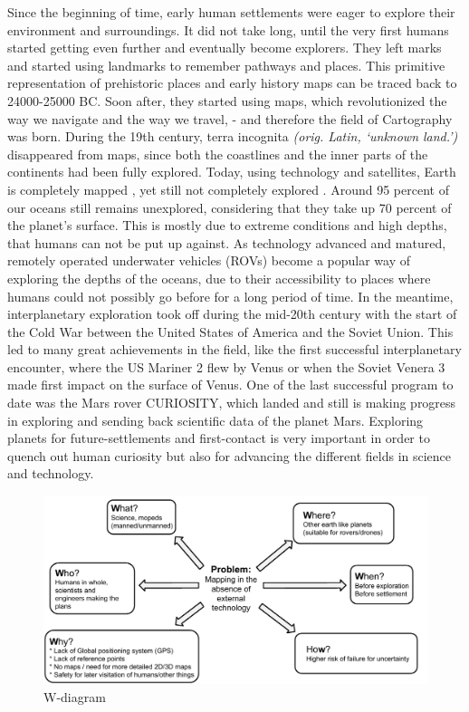 Since the beginning of time, early human settlements were eager to explore their environment and surroundings. It did not take long, until the very first humans started getting even further and eventually become explorers. They left marks and started using landmarks to remember pathways and places. This primitive representation of prehistoric places and early history maps can be traced back to 24000-25000 BC\cite{cavedrawings}. Soon after, they started using maps, which revolutionized the way we navigate and the way we travel, - and therefore the field of Cartography was born. During the 19th century, terra incognita \textit{(orig. Latin, ‘unknown land.’)} disappeared from maps, since both the coastlines and the inner parts of the continents had been fully explored. Today, using technology and satellites, Earth is completely mapped %
, yet still not completely explored %
. Around 95 percent of our oceans still remains unexplored, considering that they take up 70 percent of the planet's surface\cite{oceandepth}. This is mostly due to extreme conditions and high depths, that humans can not be put up against. As technology advanced and matured, remotely operated underwater vehicles (ROVs) become a popular way of exploring the depths of the oceans, due to their accessibility to places where humans could not possibly go before for a long period of time. In the meantime, interplanetary exploration took off during the mid-20th century with the start of the Cold War between the United States of America and the Soviet Union. This led to many great achievements in the field, like the first successful interplanetary encounter, where the US Mariner 2 flew by Venus\cite{firstflyby} or when the Soviet Venera 3 made first impact on the surface of Venus\cite{firstimpact}. One of the last successful program to date was the Mars rover CURIOSITY, which landed and still is making progress in exploring and sending back scientific data of the planet Mars. Exploring planets for future-settlements and first-contact is very important in order to quench out human curiosity but also for advancing the different fields in science and technology.

\clearpage

\begin{figure}[!h]
	\centering
	\includegraphics[scale=.7]{images/wdiagram1.pdf}
	\caption{W-diagram}
	\label{fig:wdiagram}
\end{figure}

